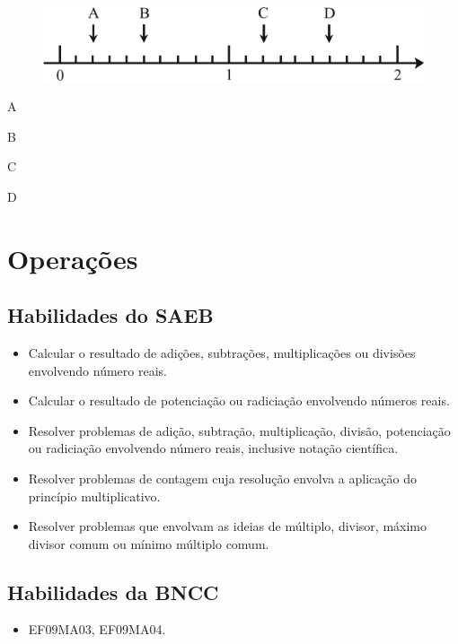\begin{figure}[htpb!]
\centering
\includegraphics[width=\textwidth]{./ilustras-mat/modulo_1-treino_3.png}
\end{figure}

\begin{escolha}
  \item A
  \item B
  \item C
  \item D
\end{escolha}

\chapter{Operações}

\section{Habilidades do SAEB}

\begin{itemize}
  \item Calcular o resultado de adições, subtrações, multiplicações ou divisões
envolvendo número reais.
  \item Calcular o resultado de potenciação ou radiciação envolvendo números
reais.
  \item Resolver problemas de adição, subtração, multiplicação, divisão,
potenciação ou radiciação envolvendo número reais, inclusive notação
científica.
  \item Resolver problemas de contagem cuja resolução envolva a aplicação do
princípio multiplicativo.
  \item Resolver problemas que envolvam as ideias de múltiplo, divisor, máximo
divisor comum ou mínimo múltiplo comum.  
\end{itemize} 

\section*{Habilidades da BNCC} 

\begin{itemize}
  \item EF09MA03, EF09MA04.
\end{itemize}

